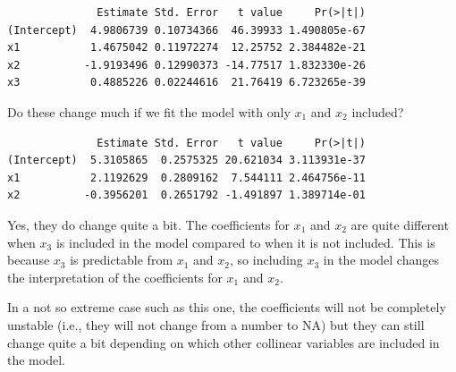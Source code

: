 \documentclass[
  letterpaper,
  8pt,
  a4paper]{book}
\newenvironment{Shaded}{\begin{snugshade}}{\end{snugshade}}
\newcommand{\AttributeTok}[1]{\textcolor[rgb]{0.40,0.45,0.13}{#1}}
\newcommand{\FunctionTok}[1]{\textcolor[rgb]{0.28,0.35,0.67}{#1}}
\newcommand{\NormalTok}[1]{\textcolor[rgb]{0.00,0.23,0.31}{#1}}
\newcommand{\OtherTok}[1]{\textcolor[rgb]{0.00,0.23,0.31}{#1}}
\newcommand{\SpecialCharTok}[1]{\textcolor[rgb]{0.37,0.37,0.37}{#1}}
\begin{document}
\begin{verbatim}
              Estimate Std. Error   t value     Pr(>|t|)
(Intercept)  4.9806739 0.10734366  46.39933 1.490805e-67
x1           1.4675042 0.11972274  12.25752 2.384482e-21
x2          -1.9193496 0.12990373 -14.77517 1.832330e-26
x3           0.4885226 0.02244616  21.76419 6.723265e-39
\end{verbatim}

Do these change much if we fit the model with only \(x_1\) and \(x_2\)
included?

\begin{Shaded}
\end{Shaded}

\begin{verbatim}
              Estimate Std. Error   t value     Pr(>|t|)
(Intercept)  5.3105865  0.2575325 20.621034 3.113931e-37
x1           2.1192629  0.2809162  7.544111 2.464756e-11
x2          -0.3956201  0.2651792 -1.491897 1.389714e-01
\end{verbatim}

Yes, they do change quite a bit. The coefficients for \(x_1\) and
\(x_2\) are quite different when \(x_3\) is included in the model
compared to when it is not included. This is because \(x_3\) is
predictable from \(x_1\) and \(x_2\), so including \(x_3\) in the model
changes the interpretation of the coefficients for \(x_1\) and \(x_2\).

\begin{tcolorbox}[enhanced jigsaw, arc=.35mm, bottomrule=.15mm, bottomtitle=1mm, breakable, colback=white, colbacktitle=quarto-callout-note-color!10!white, colframe=quarto-callout-note-color-frame, coltitle=black, left=2mm, leftrule=.75mm, opacityback=0, opacitybacktitle=0.6, rightrule=.15mm, title=\textcolor{quarto-callout-note-color}{\faInfo}\hspace{0.5em}{Note}, titlerule=0mm, toprule=.15mm, toptitle=1mm]

In a not so extreme case such as this one, the coefficients will not be
completely unstable (i.e., they will not change from a number to NA) but
they can still change quite a bit depending on which other collinear
variables are included in the model.

\end{tcolorbox}
\end{document}
